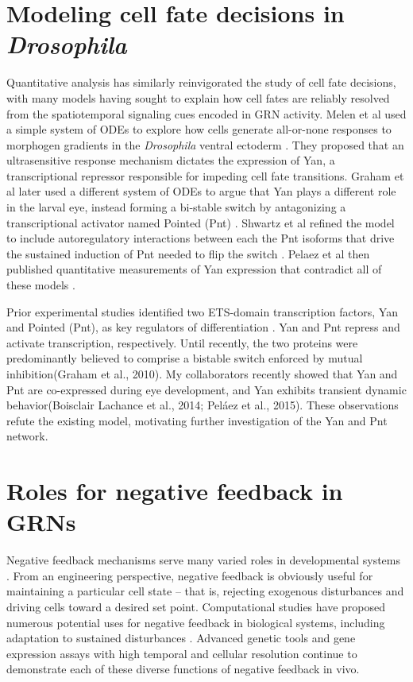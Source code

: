 \section{Modeling cell fate decisions in \emph{Drosophila}}

Quantitative analysis has similarly reinvigorated the study of cell fate decisions, with many models having sought to explain how cell fates are reliably resolved from the spatiotemporal signaling cues encoded in GRN activity. Melen et al used a simple system of ODEs to explore how cells generate all-or-none responses to morphogen gradients in the \textit{Drosophila} ventral ectoderm \cite{Melen2005}. They proposed that an ultrasensitive response mechanism dictates the expression of Yan, a transcriptional repressor responsible for impeding cell fate transitions. Graham et al later used a different system of ODEs to argue that Yan plays a different role in the larval eye, instead forming a bi-stable switch by antagonizing a transcriptional activator named Pointed (Pnt) \cite{Graham2010}. Shwartz et al refined the model to include autoregulatory interactions between each the Pnt isoforms that drive the sustained induction of Pnt needed to flip the switch \cite{Shwartz2013}. Pelaez et al then published quantitative measurements of Yan expression that contradict all of these models \cite{Pelaez2015}. 


Prior experimental studies identified two ETS-domain transcription factors, Yan and Pointed (Pnt), as key regulators of differentiation \cite{Lai1992,Rebay1995}. Yan and Pnt repress and activate transcription, respectively. Until recently, the two proteins were predominantly believed to comprise a bistable switch enforced by mutual inhibition(Graham et al., 2010). My collaborators recently showed that Yan and Pnt are co-expressed during eye development, and Yan exhibits transient dynamic behavior(Boisclair Lachance et al., 2014; Peláez et al., 2015). These observations refute the existing model, motivating further investigation of the Yan and Pnt network. 




\section{Roles for negative feedback in GRNs}
 
Negative feedback mechanisms serve many varied roles in developmental systems \cite{Freeman2000}. From an engineering perspective, negative feedback is obviously useful for maintaining a particular cell state – that is, rejecting exogenous disturbances and driving cells toward a desired set point. Computational studies have proposed numerous potential uses for negative feedback in biological systems, including adaptation to sustained disturbances \cite{Alon2007,Behar2007,Yi2000}. Advanced genetic tools and gene expression assays with high temporal and cellular resolution continue to demonstrate each of these diverse functions of negative feedback in vivo.

